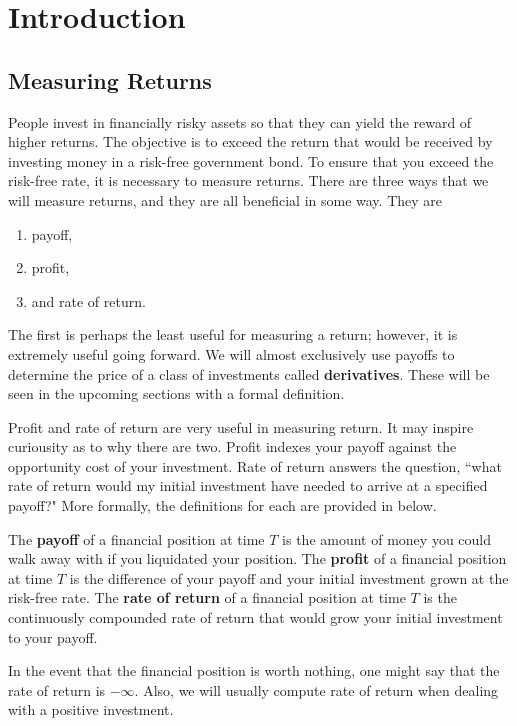 \documentclass{ximera}
\begin{document}
\chapter{Introduction}

\section{Measuring Returns}
People invest in financially risky assets so that they can yield the reward of higher returns. The objective is to exceed the return that would be received by investing money in a risk-free government bond. To ensure that you exceed the risk-free rate, it is necessary to measure returns. There are three ways that we will measure returns, and they are all beneficial in some way. They are

\begin{enumerate}
\item payoff,
\item profit,
\item and rate of return. 
\end{enumerate}

The first is perhaps the least useful for measuring a return; however, it is extremely useful going forward. We will almost exclusively use payoffs to determine the price of a class of investments called {\bf derivatives}. These will be seen in the upcoming sections with a formal definition.

Profit and rate of return are very useful in measuring return. It may inspire curiousity as to why there are two. Profit indexes your payoff against the opportunity cost of your investment. Rate of return answers the question, ``what rate of return would my initial investment have needed to arrive at a specified payoff?" More formally, the definitions for each are provided in below.

\begin{definition}\label{def9}
The {\bf payoff} of a financial position at time $T$ is the amount of money you could walk away with if you liquidated your position. The {\bf profit} of a financial position at time $T$ is the difference of your payoff and your initial investment grown at the risk-free rate. The {\bf rate of return} of a financial position at time $T$ is the continuously compounded rate of return that would grow your initial investment to your payoff. 
\end{definition}

\begin{remark}
In the event that the financial position is worth nothing, one might say that the rate of return is $-\infty$. Also, we will usually compute rate of return when dealing with a positive investment. 
\end{remark}
\end{document}
